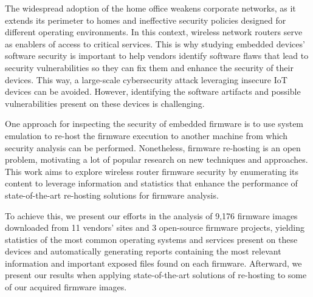 The widespread adoption of the home office weakens corporate networks, as it extends its perimeter to homes and ineffective security policies designed for different operating environments. In this context, wireless network routers serve as enablers of access to critical services. This is why studying embedded devices' software security is important to help vendors identify software flaws that lead to security vulnerabilities so they can fix them and enhance the security of their devices. This way, a large-scale cybersecurity attack leveraging insecure IoT devices can be avoided. However, identifying the software artifacts and possible vulnerabilities present on these devices is challenging. 

One approach for inspecting the security of embedded firmware is to use system emulation to re-host the firmware execution to another machine from which security analysis can be performed. Nonetheless, firmware re-hosting is an open problem, motivating a lot of popular research on new techniques and approaches. This work aims to explore wireless router firmware security by enumerating its content to leverage information and statistics that enhance the performance of state-of-the-art re-hosting solutions for firmware analysis.

To achieve this, we present our efforts in the analysis of 9,176 firmware images downloaded from 11 vendors' sites and 3 open-source firmware projects, yielding statistics of the most common operating systems and services present on these devices and automatically generating reports containing the most relevant information and important exposed files found on each firmware. Afterward, we present our results when applying state-of-the-art solutions of re-hosting to some of our acquired firmware images.

